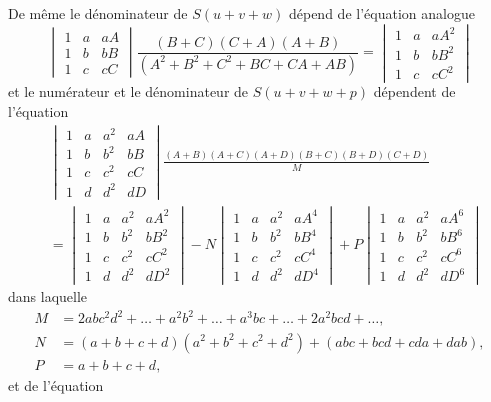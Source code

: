 \documentclass[12pt,a4paper]{article}
\theoremstyle{definition}
\begin{document}
De m\^{e}me le d\'{e}nominateur de $S(u + v + w)$ d\'{e}pend de l'\'{e}quation analogue
\[
\begin{vmatrix}
1 & a & aA \\
1 & b & bB \\
1 & c & cC
\end{vmatrix}
\frac{(B + C)(C + A)(A + B)}{(A^2 + B^2 + C^2 + BC + CA + AB)} =
\begin{vmatrix}
1 & a & aA^2 \\
1 & b & bB^2 \\
1 & c & cC^2
\end{vmatrix}
\]
et le num\'{e}rateur et le d\'{e}nominateur de $S(u + v + w + p)$ d\'{e}pendent de l'\'{e}quation
\begin{align*}
&\begin{vmatrix}
1 & a & a^2 & aA \\
1 & b & b^2 & bB \\
1 & c & c^2 & cC \\
1 & d & d^2 & dD
\end{vmatrix}
\frac{(A + B)(A + C)(A + D)(B + C)(B + D)(C + D)}{M} \\
&= \begin{vmatrix}
1 & a & a^2 & aA^2 \\
1 & b & b^2 & bB^2 \\
1 & c & c^2 & cC^2 \\
1 & d & d^2 & dD^2
\end{vmatrix}
- N
\begin{vmatrix}
1 & a & a^2 & aA^4 \\
1 & b & b^2 & bB^4 \\
1 & c & c^2 & cC^4 \\
1 & d & d^2 & dD^4
\end{vmatrix}
+ P
\begin{vmatrix}
1 & a & a^2 & aA^6 \\
1 & b & b^2 & bB^6 \\
1 & c & c^2 & cC^6 \\
1 & d & d^2 & dD^6
\end{vmatrix}
\end{align*}
dans laquelle
\begin{align*}
M &= 2abc^2d^2 + \ldots + a^2b^2 + \ldots + a^3bc + \ldots + 2a^2bcd + \ldots, \\
N &= (a + b + c + d)(a^2 + b^2 + c^2 + d^2) + (abc + bcd + cda + dab), \\
P &= a + b + c + d,
\end{align*}
et de l'\'{e}quation
\end{document}
